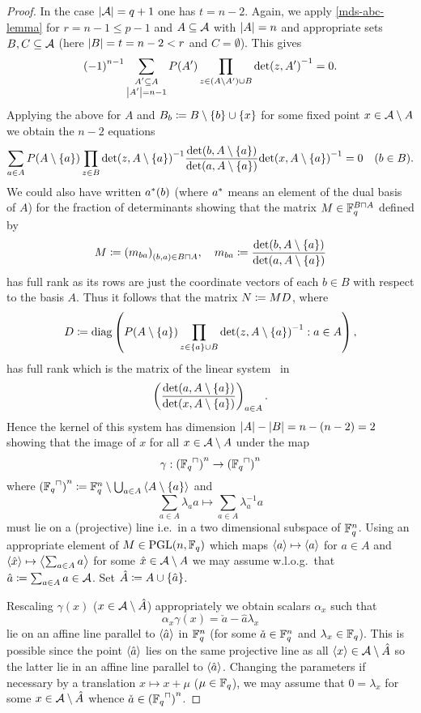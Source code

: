 \begin{proof}
    In the case $\left\vert{\mathcal{A}}\right\vert=q+1$ one has $t=n-2$.
    Again, we apply \autoref{mds-abc-lemma} for $r=n-1\leq p-1$ and $A\subseteq \mathcal{A}$ with
    $\left\vert{A}\right\vert=n$ and appropriate sets $B,C\subseteq \mathcal{A}$ (here $\left\vert{B}\right\vert=t=n-2<r$ and $C=\emptyset$). This gives
    $$ {(-1)}^{n-1}\sum_{\substack{A'\subseteq A \\
            \left\vert{A'}\right\vert=n-1}}{P(A')\prod_{z\in (A\setminus A')\cup
            B}{{\det(z,A')}^{-1}}} = 0.
    $$
    Applying the above for $A$ and $B_b\defeq B\setminus\set{b}\setjoin\set{x}$ for some fixed point $x\in \mathcal{A}\setminus A$ we obtain the $n-2$ equations
    $$
    \sum_{a\in A}{P(A\setminus\set{a})\prod_{z\in B}{{{\det(z,A\setminus\set{a})}^{-1}}}\frac{\det(b,A\setminus\set{a})}{\det(a,A\setminus\set{a})}{\det(x,A\setminus\set{a})}^{-1}} = 0\quad (b\in B).\label{mds-class-n-leq-p-keysys}
    $$
    We could also have written ${a}^{\ast}(b)$ (where ${a}^{\ast}$ means an element of the dual basis of $A$) for the fraction of determinants showing that the matrix $M\in\field{q}^{B\setprod A}$ defined by
    $$
    M\defeq {(m_{ba})}_{(b,a)\in B\setprod A},\quad
    m_{ba} \defeq \frac{\det(b,A\setminus\set{a})}{\det(a,A\setminus\set{a})}
    $$
    has full rank as its rows are just the coordinate vectors of each $b\in B$ with respect to the basis $A$.
    Thus it follows that the matrix $N\mathrel{\mathrel{\mathop:}\mkern-1.2mu=} MD$, where
    $$
    D\defeq \diag\seq{P(A\setminus\set{a})\prod_{z\in\set a\setjoin B}{{{\det(z,A\setminus\set{a})}^{-1}}}}[a\in A],
    $$ has full rank which is the matrix of the linear system~ in
    $$
    \seq{\frac{\det(a,A\setminus\set a)}{\det(x,A\setminus\set a)}}_{a\in A}.
    $$
    Hence the kernel of this system has dimension $\left\vert{A}\right\vert-\left\vert{B}\right\vert=n-(n-2)=2$ showing that the image of $x$ for all $x\in \mathcal{A}\setminus A$ under the map
    $$
    \gamma:{(\units{\field{q}})}^n\to{(\units{\field{q}})}^n
    $$
    where ${(\units{\field{q}})}^n\defeq \field{q}^n\setminus\Setjoin_{a\in A}{\gen{A\setminus\set{a}}}$ and
    $$
    \sum_{a\in A}{\lambda_a a}\mapsto \sum_{a\in A}{\lambda_a^{-1} a}
    $$
    must lie on a (projective) line i.e.~in a two dimensional subspace of $\mathbb{F}_{q}^n$.
    Using an appropriate element of $M\in\mathrm{PGL}(n,\mathbb{F}_{q})$ which maps $\gen a \mapsto \gen a$ for $a\in A$ and $\gen{\hat x}\mapsto \gen{\sum_{a\in A}{a}}$ for some $\hat x\in \mathcal{A}\setminus A$ we may assume w.l.o.g.~that $\hat a\mathrel{\mathrel{\mathop:}\mkern-1.2mu=} \sum_{a\in A}{a}\in \mathcal{A}$. Set $\hat{A}\defeq A\setjoin\set{\hat a}$. 

    Rescaling $\gamma(x)$ ($x\in\mathcal{A}\setminus \hat A$) appropriately we obtain scalars $\alpha_x$ such that
    $$
    \alpha_x\gamma(x)=\check a-\hat a\lambda_x
    $$
    lie on an affine line parallel to $\gen{\hat a}$ in $\mathbb{F}_{q}^n$ (for some $\check a\in\mathbb{F}_{q}^n$ and $\lambda_x\in\mathbb{F}_{q}$). This is possible since the point $\gen{\hat a}$ lies on the same projective line as all $\gen x\in\cA\setminus \hat A$ so the latter lie in an affine line parallel to $\gen{\hat a}$.
    Changing the parameters if necessary by a translation $x\mapsto x+\mu$ ($\mu\in\mathbb{F}_{q}$), we may assume that $0=\lambda_x$ for some $x\in \mathcal{A}\setminus \hat{A}$ whence $\check a\in {(\units{\field{q}})}^n$.


\end{proof}
